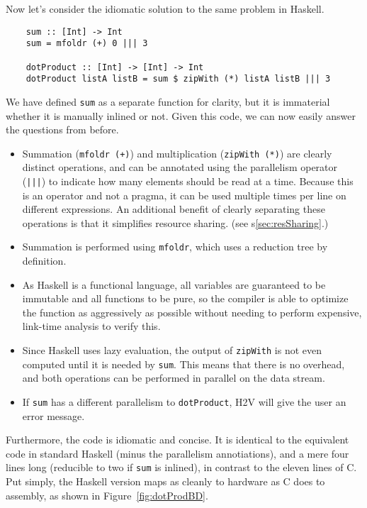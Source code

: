 \documentclass[english,onecolumn]{scrartcl}
\begin{document}
Now let's consider the idiomatic solution to the same problem in Haskell.

\begin{lstlisting}
    sum :: [Int] -> Int
    sum = mfoldr (+) 0 ||| 3

    dotProduct :: [Int] -> [Int] -> Int
    dotProduct listA listB = sum $ zipWith (*) listA listB ||| 3
\end{lstlisting}

We have defined \texttt{sum} as a separate function for clarity, but it is immaterial whether it is manually inlined or not.
Given this code, we can now easily answer the questions from before.
\begin{itemize}
    \item Summation (\texttt{mfoldr (+)}) and multiplication (\texttt{zipWith (*)}) are clearly distinct operations,
        and can be annotated using the parallelism operator (\texttt{|||}) to indicate how many elements should be read at a time.
        Because this is an operator and not a pragma, it can be used multiple times per line on different expressions.
        An additional benefit of clearly separating these operations is that it simplifies resource sharing.
        (see s\ref{sec:resSharing}.)
    \item Summation is performed using \texttt{mfoldr}, which uses a reduction tree by definition.
    \item As Haskell is a functional language, all variables are guaranteed to be immutable and all functions to be pure,
        so the compiler is able to optimize the function as aggressively as possible without needing to perform expensive,
        link-time analysis to verify this.
    \item Since Haskell uses lazy evaluation, the output of \texttt{zipWith} is not even computed until it is needed by
        \texttt{sum}. This means that there is no overhead, and both operations can be performed in parallel on the data stream.
    \item If \texttt{sum} has a different parallelism to \texttt{dotProduct}, H2V will give the user an error message.
\end{itemize}

Furthermore, the code is idiomatic and concise. It is identical to the equivalent code in standard Haskell (minus the parallelism
annotiations), and a mere four lines long (reducible to two if \texttt{sum} is inlined), in contrast to the eleven lines of C.
Put simply, the Haskell version maps as cleanly to hardware as C does to assembly, as shown in Figure~\ref{fig:dotProdBD}.
\end{document}
